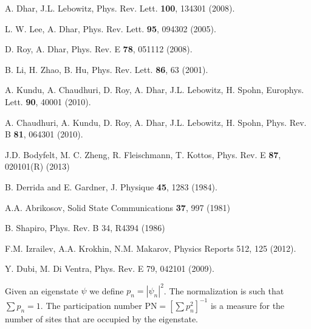 \documentclass[twocolumn,showpacs,aps,pre]{revtex4-1}
\begin{document}
\begin{thebibliography}{99}
A. Dhar, J.L. Lebowitz, 
Phys. Rev. Lett. {\bf 100}, 134301 (2008).

L. W. Lee, A. Dhar, 
Phys. Rev. Lett. {\bf 95}, 094302 (2005).

D. Roy, A. Dhar, 
Phys. Rev. E {\bf 78}, 051112 (2008).

B. Li, H. Zhao, B. Hu, 
Phys. Rev. Lett. {\bf 86}, 63 (2001).

A. Kundu, A. Chaudhuri, D. Roy, A. Dhar, J.L. Lebowitz, H. Spohn,
Europhys. Lett. {\bf 90}, 40001 (2010).

A. Chaudhuri, A. Kundu, D. Roy, A. Dhar, J.L. Lebowitz, H. Spohn,
Phys. Rev. B {\bf 81}, 064301 (2010).

J.D. Bodyfelt, M. C. Zheng, R. Fleischmann, T. Kottos, 
Phys. Rev. E {\bf 87}, 020101(R) (2013)

B. Derrida and E. Gardner, 
J. Physique {\bf 45}, 1283 (1984). 

A.A. Abrikosov, 
Solid State Communications {\bf 37}, 997 (1981)

B. Shapiro, 
Phys. Rev. B 34, R4394 (1986)


F.M. Izrailev, A.A. Krokhin, N.M. Makarov,
Physics Reports 512, 125 (2012).

Y. Dubi, M. Di Ventra,
Phys. Rev. E 79, 042101 (2009).

Given an eigenstate $\psi$ we define $p_n=|\psi_n|^2$.
The normalization is such that $\sum p_n=1$. 
The participation number PN$=[\sum p_n^2]^{-1}$ 
is a measure for the number of sites that are occupied 
by the eigenstate.

\end{thebibliography}



\clearpage
\end{document}
